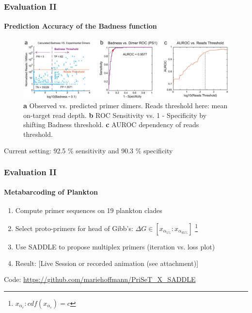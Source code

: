 \documentclass[xcolor=dvipsnames,envcountsect]{beamer}
\begin{document}
\begin{frame}
	\frametitle{Evaluation II}\framesubtitle{Prediction Accuracy of the Badness function}
	\begin{figure}
    \includegraphics[width=\textwidth]{fig4_top_paper}
    \caption{{\bf a} Observed vs. predicted primer dimers. Reads threshold here: mean on-target read depth. {\bf b} ROC Sensitivity vs. 1 - Specificity by shifting Badness threshold. \textbf{c} AUROC dependency of reads threshold.}
\end{figure}
Current setting: 92.5 \% sensitivity and 90.3 \% specificity
\end{frame}

\begin{frame}
	\frametitle{Evaluation II}\framesubtitle{Metabarcoding of Plankton}
    \begin{enumerate}
        \item Compute primer sequences on 19 plankton clades \cite{PriSeT2021}
        \item Select proto-primers for head of Gibb's: $\Delta G \in [x_{\alpha_{5\%}}:x_{\alpha_{95\%}}]$ \footnote{$x_{\alpha_c}: cdf(x_{\alpha_c}) = c$} %
        \item Use SADDLE to propose multiplex primers (iteration vs. loss plot)
        
        \item Result: [Live Session or recorded animation (see attachment)]
    \end{enumerate}
	
\vspace*{\fill}
Code: \url{https://github.com/mariehoffmann/PriSeT_X_SADDLE}
\end{frame}
\end{document}
